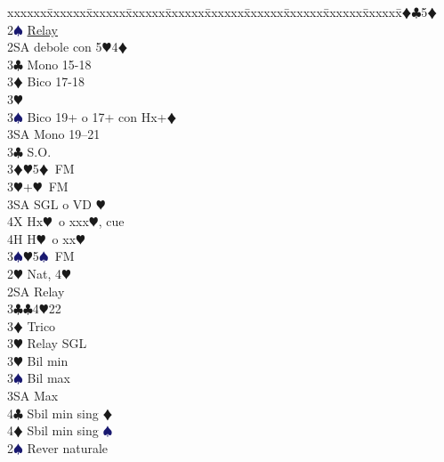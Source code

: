 \documentclass[a4paper,italian]{article}
\newcommand{\BC}{\textcolor{OliveGreen}{$\clubsuit$}}
\newcommand{\BD}{\textcolor{RedOrange}{$\vardiamondsuit$}}
\newcommand{\BH}{\textcolor{Red2}{$\varheartsuit${}}}
\newcommand{\BS}{\textcolor{MidnightBlue}{$\spadesuit${}}}
\newenvironment{bidtable}
{\begin{tabbing}

    xxxxxx\=xxxxxx\=xxxxxx\=xxxxxx\=xxxxxx\=xxxxxx\=xxxxxx\=xxxxxx\=xxxxxx\=xxxxxx\=\kill}
{\end{tabbing} }%
\begin{document}
\begin{multicols}{2}
\begin{bidtable}
                                        3\BD {}\BC 5\BD \-\\
                                        2\BS \> \hyperref[multirever]{Relay}\\
                                        2SA \> debole con 5\BH 4\BD \+\\
                                        3\BC \> Mono 15-18\\
                                        3\BD \> Bico 17-18\\
                                        3\BH {}\\
                                        3\BS \> Bico 19+ o 17+ con Hx+\BD\\
                                        3SA \> Mono 19--21\-\\
                                        3\BC \> S.O.\\
                                        3\BD {}\BH 5\BD\ FM\\
                                        3\BH {}+\BH\ FM\+\\
                                        3SA SGL o VD \BH\\
                                        4X Hx\BH\ o xxx\BH, cue\\
                                        4H H\BH\ o xx\BH\-\\
                                        3\BS {}\BH 5\BS\ FM\-\\
                                        2\BH \> Nat, 4\BH \+\\
                                        2SA \> Relay\+\\
                                        3\BC {}\BC 4\BH 22\\
                                        3\BD \> Trico\+\\
                                        3\BH \> Relay SGL\-\\
                                        3\BH \> Bil min\\
                                        3\BS \> Bil max\\
                                        3SA  Max\\
                                        4\BC \> Sbil min sing \BD \\
                                        4\BD \> Sbil min sing \BS \-\-\\
                                        2\BS \> Rever naturale\+\\

\end{bidtable}
\end{multicols}
\end{document}

